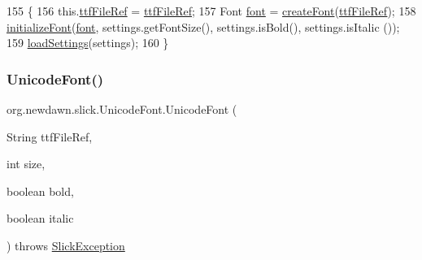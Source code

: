 \begin{DoxyCode}
155                                                                                          \{
156         this.\mbox{\hyperlink{classorg_1_1newdawn_1_1slick_1_1_unicode_font_a2f13dde71bdabcab77c49030a4af17f2}{ttfFileRef}} = \mbox{\hyperlink{classorg_1_1newdawn_1_1slick_1_1_unicode_font_a2f13dde71bdabcab77c49030a4af17f2}{ttfFileRef}};
157         Font \mbox{\hyperlink{classorg_1_1newdawn_1_1slick_1_1_unicode_font_a956ab491839be375d47444a67ebff11c}{font}} = \mbox{\hyperlink{classorg_1_1newdawn_1_1slick_1_1_unicode_font_a1db149740542db5d183ef9307b0a45ff}{createFont}}(\mbox{\hyperlink{classorg_1_1newdawn_1_1slick_1_1_unicode_font_a2f13dde71bdabcab77c49030a4af17f2}{ttfFileRef}});
158         \mbox{\hyperlink{classorg_1_1newdawn_1_1slick_1_1_unicode_font_a50d0619aea65cc8ebdc66a2d7c63aede}{initializeFont}}(\mbox{\hyperlink{classorg_1_1newdawn_1_1slick_1_1_unicode_font_a956ab491839be375d47444a67ebff11c}{font}}, settings.getFontSize(), settings.isBold(), settings.isItalic
      ());
159         \mbox{\hyperlink{classorg_1_1newdawn_1_1slick_1_1_unicode_font_aa3d36e87e8bb263a354409ed1c1f761b}{loadSettings}}(settings);
160     \}
\end{DoxyCode}
\mbox{\label{classorg_1_1newdawn_1_1slick_1_1_unicode_font_a45cb814b2f8c0ec1e8dbc92c4594b33f}} 
\subsubsection{\texorpdfstring{Unicode\+Font()}{UnicodeFont()}\hspace{0.1cm}{\footnotesize\ttfamily [3/7]}}
{\footnotesize\ttfamily org.\+newdawn.\+slick.\+Unicode\+Font.\+Unicode\+Font (\begin{DoxyParamCaption}\item[{String}]{ttf\+File\+Ref,  }\item[{int}]{size,  }\item[{boolean}]{bold,  }\item[{boolean}]{italic }\end{DoxyParamCaption}) throws \mbox{\hyperlink{classorg_1_1newdawn_1_1slick_1_1_slick_exception}{Slick\+Exception}}\hspace{0.3cm}{\ttfamily [inline]}}

